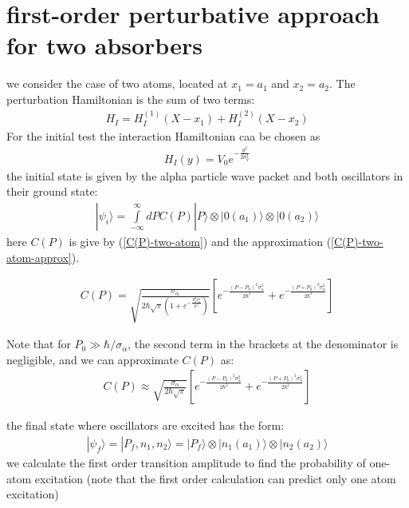 \newpage
\section{first-order perturbative approach for two absorbers}\label{section-two-absorbers-o1}

we consider the case of two atoms, located at $x_1=a_1$ and $x_2=a_2$. The perturbation Hamiltonian is the sum of two terms:
\begin{align}
  H_I = H_I^{(1)}(X-x_1) +H_I^{(2)}(X-x_2)
\end{align}
For the initial test the interaction Hamiltonian caa be chosen as
\begin{align}
  H_I(y)=V_0 e^{-\frac{y^2}{2\sigma_V^2}}
\end{align}
the initial state is given by the alpha particle wave packet and both oscillators in their ground state:
\begin{align}
  |\psi_i\rangle = \int\limits_{-\infty}^{\infty}dP C(P)|P\rangle\otimes|0(a_1)\rangle\otimes|0(a_2)\rangle
\end{align}
here $C(P)$ is give by (\ref{C(P)-two-atom}) and the approximation (\ref{C(P)-two-atom-approx}).
\begin{importantbox}
  \begin{align}
    C(P) = \sqrt{\frac{\sigma_\alpha}{2\hbar\sqrt{\pi}\left(1+e^{-\frac{P_0^2\sigma_\alpha^2}{\hbar^2}}\right)}}\left[ e^{-\frac{(P-P_0)^2\sigma_\alpha^2}{2\hbar^2}} + e^{-\frac{(P+P_0)^2\sigma_\alpha^2}{2\hbar^2}} \right]\label{C(P)-two-atom-used-o1}
  \end{align}

  Note that for $P_0 \gg \hbar/\sigma_\alpha$, the second term in the brackets at the denominator is negligible, and we can approximate $C(P)$ as:
  \begin{align}
    C(P) \approx \sqrt{\frac{\sigma_\alpha}{2\hbar\sqrt{\pi}}}\left[ e^{-\frac{(P-P_0)^2\sigma_\alpha^2}{2\hbar^2}}+ e^{-\frac{(P+P_0)^2\sigma_\alpha^2}{2\hbar^2}} \right]\label{C(P)-two-atom-approx-used-o1}
  \end{align}
\end{importantbox}
the final state where  oscillators are excited has the form:
\begin{align}
  |\psi_f\rangle = |P_f, n_1, n_2\rangle = |P_f\rangle\otimes|n_1(a_1)\rangle\otimes|n_2(a_2)\rangle
\end{align}
we calculate the first order transition amplitude to find the probability of one-atom excitation (note that the first order calculation can predict only one atom excitation)

